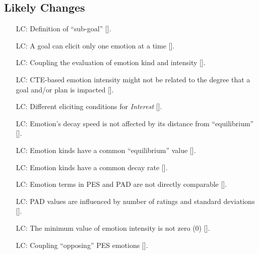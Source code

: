 \subsection{Likely Changes}\label{sec_Expand}

\noindent \begin{itemize}

    \item[LC\refstepcounter{lcnum}\thelcnum\label{LC_Subgoal}:]
    Definition of ``sub-goal'' [].

    \item[LC\refstepcounter{lcnum}\thelcnum\label{LC_Goal2Emotion}:]
    A goal can elicit only one emotion at a time [].

    \item[LC\refstepcounter{lcnum}\thelcnum\label{LC_EmotionTypeIntensity}:]
    Coupling the evaluation of emotion kind and intensity
    [].

    \item[LC\refstepcounter{lcnum}\thelcnum\label{LC_Goal2Intensity}:]
    CTE-based emotion intensity might not be related to the degree that a goal
    and/or plan is impacted [].

    \item[LC\refstepcounter{lcnum}\thelcnum\label{LC_Interest}:]
    Different eliciting conditions for \textit{Interest} [].

    \item[LC\refstepcounter{lcnum}\thelcnum\label{LC_DecaySpeed}:]
    Emotion's decay speed is not affected by its distance from ``equilibrium''
    [].

    \item[LC\refstepcounter{lcnum}\thelcnum\label{LC_Equilibrium}:]
    Emotion kinds have a common ``equilibrium'' value [].

    \item[LC\refstepcounter{lcnum}\thelcnum\label{LC_DecayRate}:]
    Emotion kinds have a common decay rate [].

    \item[LC\refstepcounter{lcnum}\thelcnum\label{LC_EmotionTerms}:]
    Emotion terms in PES and PAD are not directly comparable
    [].

    \item[LC\refstepcounter{lcnum}\thelcnum\label{LC_PADStats}:]
    PAD values are influenced by number of ratings and standard deviations
    [].

    \item[LC\refstepcounter{lcnum}\thelcnum\label{LC_PositiveIntensity}:]
    The minimum value of emotion intensity is not zero (0)
    [].

    \item[LC\refstepcounter{lcnum}\thelcnum\label{LC_EmotionPairs}:]
    Coupling ``opposing'' PES emotions [].

\end{itemize}